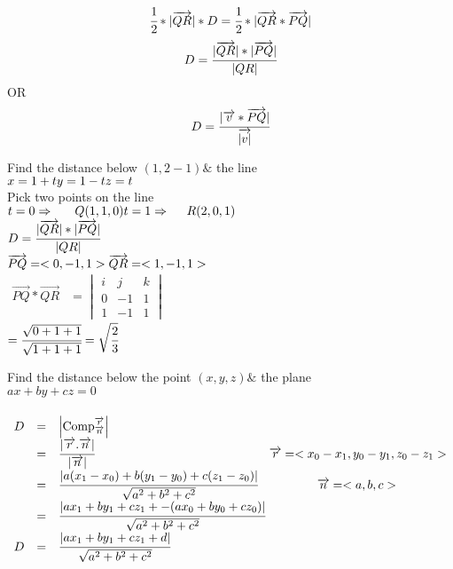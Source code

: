 {}\\
$$\cfrac{1}{2}*|\overrightarrow{QR}|*D=\cfrac{1}{2}*|\overrightarrow{QR}*\overrightarrow{PQ}|$$
$$D=\cfrac{|\overrightarrow{QR}|*|\overrightarrow{PQ}|}{|QR|}$$
OR \\
$$D=\cfrac{|\overrightarrow{v}*\overrightarrow{PQ}|}{\overrightarrow{|v|}}$$
\begin{example}
Find the distance below $(1,2-1) \&$ the line \\ 
$x=1+t \\
y=1-t \\
z=t$\\
{}
Pick two points on the line \\
$t=0 \Rightarrow ~~~~~ Q(1,1,0) \\
t=1 \Rightarrow ~~~~  R(2,0,1)$\\
$D=\cfrac{|\overrightarrow{QR}|*|\overrightarrow{PQ}|}{|QR|}$\\ 
$\overrightarrow{PQ}=<0,-1,1> \\
\overrightarrow{QR} =<1,-1,1>$ \\
$\begin{array}{rcl}
\overrightarrow{PQ}*\overrightarrow{QR} & =
\begin{vmatrix}
 i& j&k  \\
0 &  -1&1  \\
 1&  -1&1 
\end{vmatrix}
\end{array}$\\
$=\cfrac{\sqrt{0+1+1}}{\sqrt{1+1+1}}=\sqrt{\cfrac{2}{3}}$
\end{example}
\noindent{\color{smalt(darkpowderblue)}\rule{\linewidth}{.2mm}}
\begin{example}
Find the distance below the point $(x,y,z) \&$ the plane \\ $ax+by+cz=0 $\\
{}\\
$\begin{array}{rcl}
D & = & \left| \mathrm{Comp}_{\overrightarrow{n}}^{\overrightarrow{r}} \right| \\
 & = & \cfrac{|\overrightarrow{r}.\overrightarrow{n}|}{|\overrightarrow{n}|} \hspace{5cm} \overrightarrow{r}=<x_0-x_1,y_0-y_1,z_0-z_1> \\
 & = & \cfrac{|a(x_1-x_0)+b(y_1-y_0)+c(z_1-z_0)|}{\sqrt{a^2+b^2+c^2}} \hspace{1.7cm} \overrightarrow{n}=<a,b,c> \\
 & = & \cfrac{|ax_1+by_1+cz_1+-(ax_0+by_0+cz_0)|}{\sqrt{a^2+b^2+c^2}} \\
D& = & \cfrac{|ax_1+by_1+cz_1+d|}{\sqrt{a^2+b^2+c^2}}
\end{array}$
\end{example} 
